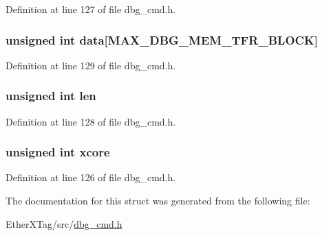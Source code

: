 Definition at line 127 of file dbg\-\_\-cmd.\-h.

\hypertarget{structdbg__cmd__type__read__mem_ab8207ec1023efdcd4c92b045fd4d2dd0}{
\subsubsection[{data}]{\setlength{\rightskip}{0pt plus 5cm}unsigned int data\mbox{[}{\bf M\-A\-X\-\_\-\-D\-B\-G\-\_\-\-M\-E\-M\-\_\-\-T\-F\-R\-\_\-\-B\-L\-O\-C\-K}\mbox{]}}}\label{structdbg__cmd__type__read__mem_ab8207ec1023efdcd4c92b045fd4d2dd0}


Definition at line 129 of file dbg\-\_\-cmd.\-h.

\hypertarget{structdbg__cmd__type__read__mem_a77124bd5f7e31e6fffc19f335da0c23f}{
\subsubsection[{len}]{\setlength{\rightskip}{0pt plus 5cm}unsigned int len}}\label{structdbg__cmd__type__read__mem_a77124bd5f7e31e6fffc19f335da0c23f}


Definition at line 128 of file dbg\-\_\-cmd.\-h.

\hypertarget{structdbg__cmd__type__read__mem_a78357326dd562d441c3c73f5676ac638}{
\subsubsection[{xcore}]{\setlength{\rightskip}{0pt plus 5cm}unsigned int xcore}}\label{structdbg__cmd__type__read__mem_a78357326dd562d441c3c73f5676ac638}


Definition at line 126 of file dbg\-\_\-cmd.\-h.



The documentation for this struct was generated from the following file\-:\begin{DoxyCompactItemize}
\item 
Ether\-X\-Tag/src/\hyperlink{dbg__cmd_8h}{dbg\-\_\-cmd.\-h}\end{DoxyCompactItemize}
